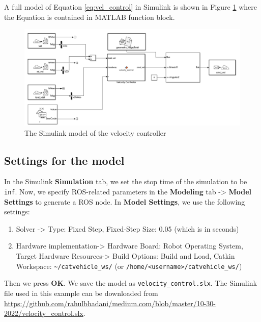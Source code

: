 \documentclass[
]{article}
\providecommand{\tightlist}{%
  \setlength{\itemsep}{0pt}\setlength{\parskip}{0pt}}
\begin{document}
A full model of Equation \eqref{eq:vel_control} in Simulink is shown in
Figure \ref{fig:simulink_model.png} where the Equation is contained in
MATLAB function block.

\begin{figure}[htbp]
\centering
\includegraphics[width=1.0\textwidth]{simulink_model.png}
\caption{The Simulink model of the velocity controller}
\label{fig:simulink_model.png}
\end{figure}

\hypertarget{settings-for-the-model}{%
\subsection{Settings for the model}\label{settings-for-the-model}}

In the Simulink \textbf{Simulation} tab, we set the stop time of the
simulation to be \texttt{inf}. Now, we specify ROS-related parameters in
the \textbf{Modeling} tab -\textgreater{} \textbf{Model Settings} to
generate a ROS node. In \textbf{Model Settings}, we use the following
settings:

\begin{enumerate}
\def\labelenumi{\arabic{enumi}.}
\tightlist
\item
  Solver -\textgreater{} Type: Fixed Step, Fixed-Step Size: 0.05 (which
  is in seconds)
\item
  Hardware implementation-\textgreater{} Hardware Board: Robot Operating
  System, Target Hardware Resources-\textgreater{} Build Options: Build
  and Load, Catkin Workspace: \texttt{\textasciitilde{}/catvehicle\_ws/}
  (or \texttt{/home/\textless{}username\textgreater{}/catvehicle\_ws/})
\end{enumerate}

Then we press \textbf{OK}. We save the model as
\texttt{velocity\_control.slx}. The Simulink file used in this example
can be downloaded from
\url{https://github.com/rahulbhadani/medium.com/blob/master/10-30-2022/velocity_control.slx}.
\end{document}
